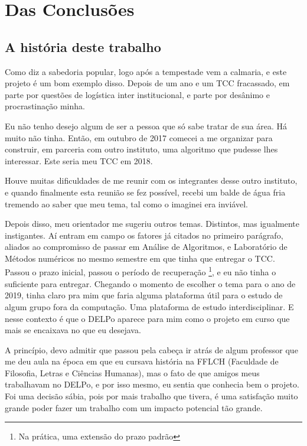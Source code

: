 \chapter{Das Conclusões}
\label{ch:conclusoes}
\minitoc


\section{A história deste trabalho}
\label{sec:about-it}

Como diz a sabedoria popular, logo após a tempestade vem a calmaria, e este projeto é um bom exemplo disso. Depois de um
ano e um TCC fracassado, em parte por questões de logística inter institucional, e parte por desânimo e procrastinação
minha.

Eu não tenho desejo algum de ser a pessoa que só sabe tratar de sua área. Há muito não tinha. Então, em outubro de 2017
comecei a me organizar para construir, em parceria com outro instituto, uma algoritmo que pudesse lhes interessar. Este
seria meu TCC em 2018.

Houve muitas dificuldades de me reunir com os integrantes desse outro instituto, e quando finalmente esta reunião se fez
possível, recebi um balde de água fria tremendo ao saber que meu tema, tal como o imaginei era inviável.

Depois disso, meu orientador me sugeriu outros temas. Distintos, mas igualmente instigantes. Aí entram em campo os fatores
já citados no primeiro parágrafo, aliados ao compromisso de passar em Análise de Algoritmos, e Laboratório de Métodos
numéricos no mesmo semestre em que tinha que entregar o TCC. Passou o prazo inicial, passou o período de recuperação
\footnote{Na prática, uma extensão do prazo padrão}, e eu não tinha o suficiente para entregar. Chegando o momento de
escolher o tema para o ano de 2019, tinha claro pra mim que faria alguma plataforma útil para o estudo de algum grupo
fora da computação. Uma plataforma de estudo interdisciplinar. E nesse contexto é que o DELPo aparece para mim como o
projeto em curso que mais se encaixava no que eu desejava.

A princípio, devo admitir que passou pela cabeça ir atrás de algum professor que me deu aula na época em que eu cursava
história na FFLCH (Faculdade de Filosofia, Letras e Ciências Humanas), mas o fato de que amigos meus trabalhavam no DELPo,
e por isso mesmo, eu sentia que conhecia bem o projeto. Foi uma decisão sábia, pois por mais trabalho que tivera, é uma
satisfação muito grande poder fazer um trabalho com um impacto potencial tão grande.

